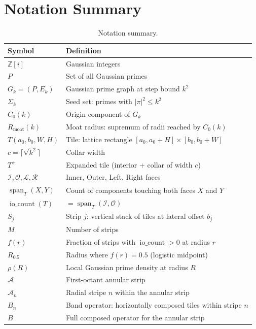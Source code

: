 \documentclass[11pt,a4paper]{article}
\newcommand{\Zi}{\mathbb{Z}[i]}
\newcommand{\Gk}{G_k}
\newcommand{\fr}{f(r)}
\newcommand{\Rmoat}{R_{\mathrm{moat}}}
\newcommand{\Rhalf}{R_{0.5}}
\newcommand{\iocount}{\operatorname{io\_count}}
\newcommand{\spant}{\operatorname{span}_T}
\newcommand{\fI}{\mathcal{I}}
\newcommand{\fO}{\mathcal{O}}
\newcommand{\fL}{\mathcal{L}}
\newcommand{\fR}{\mathcal{R}}
\newcommand{\Tplus}{T^+}
\theoremstyle{definition}
\theoremstyle{plain}
\theoremstyle{remark}
\begin{document}
\appendix

\section{Notation Summary}\label{app:notation}

\begin{table}[ht]
\centering
\begin{tabular}{@{}ll@{}}
\toprule
Symbol & Definition \\
\midrule
$\Zi$                            & Gaussian integers \\
$P$                              & Set of all Gaussian primes \\
$\Gk = (P, E_k)$                & Gaussian prime graph at step bound $k^2$ \\
$\Sigma_k$                       & Seed set: primes with $|\pi|^2 \le k^2$ \\
$C_0(k)$                         & Origin component of $\Gk$ \\
$\Rmoat(k)$                      & Moat radius: supremum of radii reached by $C_0(k)$ \\
$T(a_0, b_0, W, H)$             & Tile: lattice rectangle $[a_0, a_0{+}H] \times [b_0, b_0{+}W]$ \\
$c = \lceil\sqrt{k^2}\rceil$    & Collar width \\
$\Tplus$                         & Expanded tile (interior + collar of width $c$) \\
$\fI, \fO, \fL, \fR$            & Inner, Outer, Left, Right faces \\
$\spant(X,Y)$                    & Count of components touching both faces $X$ and $Y$ \\
$\iocount(T)$                    & $= \spant(\fI, \fO)$ \\
$S_j$                            & Strip $j$: vertical stack of tiles at lateral offset $b_j$ \\
$M$                              & Number of strips \\
$\fr$                            & Fraction of strips with $\iocount > 0$ at radius $r$ \\
$\Rhalf$                         & Radius where $\fr = 0.5$ (logistic midpoint) \\
$\rho(R)$                        & Local Gaussian prime density at radius $R$ \\
$\mathcal{A}$                    & First-octant annular strip \\
$\mathcal{A}_n$                  & Radial stripe $n$ within the annular strip \\
$B_n$                            & Band operator: horizontally composed tiles within stripe $n$ \\
$B$                              & Full composed operator for the annular strip \\
\bottomrule
\end{tabular}
\caption{Notation summary.}
\label{tab:notation}
\end{table}
\end{document}
